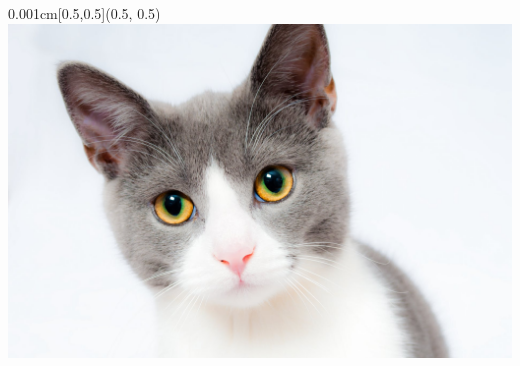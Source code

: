 \documentclass{EESD}
\begin{document}
{
\begin{frame}[t]{}
    \begin{textblock*}{0.001cm}[0.5,0.5](0.5\textwidth, 0.5\textheight)
    \includegraphics[height = 0.25\textheight]{cat.jpeg}
    \end{textblock*}
\end{frame}
}
\end{document}
